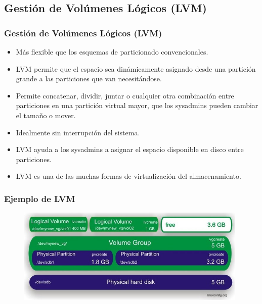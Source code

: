\documentclass{beamer}
\begin{document}
\subsection{Gestión de Volúmenes Lógicos (LVM)}
\begin{frame}
  \frametitle{Gestión de Volúmenes Lógicos (LVM)}
  \begin{itemize}
    \item Más flexible que los esquemas de particionado convencionales. 
    \item LVM permite que el espacio sea dinámicamente asignado desde una partición grande a las particiones que van necesitándose.
    \item Permite concatenar, dividir, juntar o cualquier otra combinación entre particiones en una partición virtual mayor, que los sysadmins pueden cambiar el tamaño o mover.
    \item Idealmente sin interrupción del sistema.
    \item LVM ayuda a los sysadmins a asignar el espacio disponible en disco entre particiones.
    \item LVM es una de las muchas formas de virtualización del almacenamiento. 
  \end{itemize}
\end{frame}

\begin{frame}
  \frametitle{Ejemplo de LVM}
\begin{figure}[h]
\begin{center}
  \includegraphics[width=11cm]{figs/lvm.png}
\end{center}
\end{figure}
\end{frame}
\end{document}
